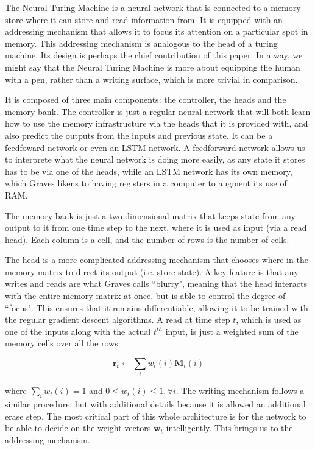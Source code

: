 \documentclass[12pt]{article}
\begin{document}
The Neural Turing Machine is a neural network that is connected to a
memory store where it can store and read information from.
It is equipped with an addressing mechanism that allows it to focus its
attention on a particular spot in memory. This addressing mechanism
is analogous to the head of a turing machine. Its design is perhaps the
chief contribution of this paper. In a way, we might say that the Neural
Turing Machine is more about equipping the human with a pen,
rather than a writing surface, which is more trivial in comparison.

It is composed of three main components: the controller, the heads and 
the memory bank. The controller is just a regular neural network that will
both learn how to use the memory infrastructure via the heads that
it is provided with, and also predict the outputs
from the inputs and previous state. It can be a feedfoward network or
even an LSTM network. A feedforward network allows us to interprete
what the neural network is doing more easily, as any state it
stores has to be via one of the heads, while an LSTM network has
its own memory, which Graves likens to having registers in a computer to
augment its use of RAM.

The memory bank is just a two dimensional matrix that keeps state from
any output to it from one time step to the next, where it is used
as input (via a read head). Each column is a cell, and the number of
rows is the number of cells.

The head is a more
complicated addressing mechanism that chooses where in the memory matrix
to direct its output (i.e. store state). A key feature is that any writes
and reads are what Graves calls ``blurry", meaning that the head interacts
with the entire memory matrix at once, but is able to control the degree
of ``focus". This ensures that it remains differentiable, allowing it
to be trained with the regular gradient descent algorithms. A read at time
step $t$, which is used as one of the inputs along with the actual $t^{th}$
input, is just a weighted sum of the memory cells over all the rows:

$$
\mathbf{r}_t \leftarrow \sum_i w_t(i) \mathbf{M}_t(i)
$$

where $\sum_i w_t(i) = 1$ and $0 \le w_t(i) \le 1, \forall i$. The writing
mechanism follows a similar procedure, but with additional
details because it is allowed an additional erase step. The most critical part
of this whole architecture is for the network to be able to decide on the weight
vectors $\mathbf{w}_t$ intelligently. This brings us to the addressing mechanism.
\end{document}
